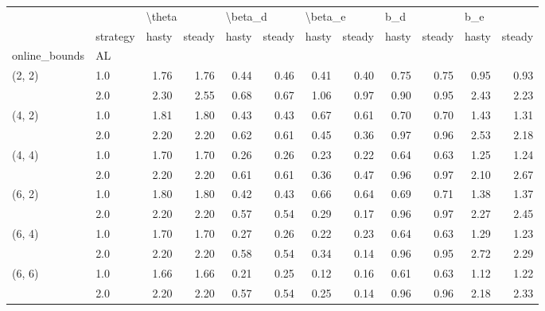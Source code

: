 \begin{tabular}{llrrrrrrrrrr}
\toprule
       & {} & \multicolumn{2}{l}{\textbackslash theta} & \multicolumn{2}{l}{\textbackslash beta\_d} & \multicolumn{2}{l}{\textbackslash beta\_e} & \multicolumn{2}{l}{b\_d} & \multicolumn{2}{l}{b\_e} \\
       & strategy &  hasty & steady &   hasty & steady &   hasty & steady & hasty & steady & hasty & steady \\
online\_bounds & AL &        &        &         &        &         &        &       &        &       &        \\
\midrule
(2, 2) & 1.0 &   1.76 &   1.76 &    0.44 &   0.46 &    0.41 &   0.40 &  0.75 &   0.75 &  0.95 &   0.93 \\
       & 2.0 &   2.30 &   2.55 &    0.68 &   0.67 &    1.06 &   0.97 &  0.90 &   0.95 &  2.43 &   2.23 \\
(4, 2) & 1.0 &   1.81 &   1.80 &    0.43 &   0.43 &    0.67 &   0.61 &  0.70 &   0.70 &  1.43 &   1.31 \\
       & 2.0 &   2.20 &   2.20 &    0.62 &   0.61 &    0.45 &   0.36 &  0.97 &   0.96 &  2.53 &   2.18 \\
(4, 4) & 1.0 &   1.70 &   1.70 &    0.26 &   0.26 &    0.23 &   0.22 &  0.64 &   0.63 &  1.25 &   1.24 \\
       & 2.0 &   2.20 &   2.20 &    0.61 &   0.61 &    0.36 &   0.47 &  0.96 &   0.97 &  2.10 &   2.67 \\
(6, 2) & 1.0 &   1.80 &   1.80 &    0.42 &   0.43 &    0.66 &   0.64 &  0.69 &   0.71 &  1.38 &   1.37 \\
       & 2.0 &   2.20 &   2.20 &    0.57 &   0.54 &    0.29 &   0.17 &  0.96 &   0.97 &  2.27 &   2.45 \\
(6, 4) & 1.0 &   1.70 &   1.70 &    0.27 &   0.26 &    0.22 &   0.23 &  0.64 &   0.63 &  1.29 &   1.23 \\
       & 2.0 &   2.20 &   2.20 &    0.58 &   0.54 &    0.34 &   0.14 &  0.96 &   0.95 &  2.72 &   2.29 \\
(6, 6) & 1.0 &   1.66 &   1.66 &    0.21 &   0.25 &    0.12 &   0.16 &  0.61 &   0.63 &  1.12 &   1.22 \\
       & 2.0 &   2.20 &   2.20 &    0.57 &   0.54 &    0.25 &   0.14 &  0.96 &   0.96 &  2.18 &   2.33 \\
\bottomrule
\end{tabular}

